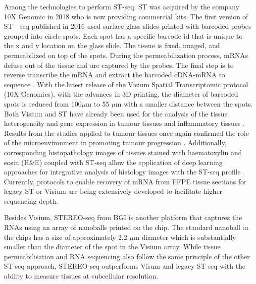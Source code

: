 Among the technologies to perform ST-seq. ST was acquired by the company 10X Genomic in 2018 who is now providing commercial kits. The first version of ST—seq published in 2016 used surface glass slides printed with barcoded probes grouped into circle spots. Each spot has a specific barcode id that is unique to the x and y location on the glass slide. The tissue is fixed, imaged, and permeabilized on top of the spots. During the permeabilization process, mRNAs defuse out of the tissue and are captured by the probes. The final step is to reverse transcribe the mRNA and extract the barcoded cDNA-mRNA to sequence \cite{staahl2016visualization, berglund2018spatial}. With the latest release of the Visium Spatial Transcriptomic protocol (10X Genomics), with the advances in 3D printing, the diameter of barcoded spots is reduced from  100$\mu$m to 55 $\mu$m with a smaller distance between the spots.  Both  Visium  and ST have already been used for the analysis of the tissue heterogeneity and gene expression in tumour tissues \cite{berglund2018spatial, thrane2018spatially, moncada2019integrating,ji2020multimodal, yoosuf2020identification} and inflammatory tissues \cite{carlberg2019exploring}. Results from the studies applied to tumour tissues once again confirmed the role of the microenvironment in promoting tumour progression \cite{thrane2018spatially, moncada2019integrating}. Additionally, corresponding histopathology images of tissues stained with haematoxylin and eosin (H\&E) coupled with ST-seq allow the application of deep learning approaches for integrative analysis of histology images with the ST-seq profile \cite{he2020integrating, tan2019spacell}. Currently, protocols to enable recovery of mRNA from FFPE tissue sections for legacy ST or Visium are being extensively developed to facilitate higher sequencing depth.           

Besides Visium, STEREO-seq from BGI is another platform that captures the RNAs using an array of nanoballs printed on the chip. The standard nanoball in the chips has a size of approximately 2.2 $\mu$m diameter which is substantially smaller than the diameter of the spot in the Visium array. While tissue permeabilisation and RNA sequencing also follow the same principle of the other ST-seq approach, STEREO-seq outperforms Visum and legacy ST-seq with the ability to measure tissues at subcellular resolution.    


